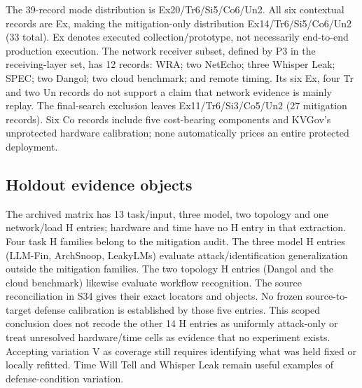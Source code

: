 The 39-record mode distribution is Ex20/Tr6/Si5/Co6/Un2. All six contextual records are Ex, making the mitigation-only distribution Ex14/Tr6/Si5/Co6/Un2 (33 total). Ex denotes executed collection/prototype, not necessarily end-to-end production execution. The network receiver subset, defined by P3 in the receiving-layer set, has 12 records: WRA; two NetEcho; three Whisper Leak; SPEC; two Dangol; two cloud benchmark; and remote timing. Its six Ex, four Tr and two Un records do not support a claim that network evidence is mainly replay. The final-search exclusion leaves Ex11/Tr6/Si3/Co5/Un2 (27 mitigation records). Six Co records include five cost-bearing components and KVGov's unprotected hardware calibration; none automatically prices an entire protected deployment.

\subsection{Holdout evidence objects}
The archived matrix has 13 task/input, three model, two topology and one network/load H entries; hardware and time have no H entry in that extraction. Four task H families belong to the mitigation audit. The three model H entries (LLM-Fin, ArchSnoop, LeakyLMs) evaluate attack/identification generalization outside the mitigation families. The two topology H entries (Dangol and the cloud benchmark) likewise evaluate workflow recognition. The source reconciliation in S34 gives their exact locators and objects. No frozen source-to-target defense calibration is established by those five entries. This scoped conclusion does not recode the other 14 H entries as uniformly attack-only or treat unresolved hardware/time cells as evidence that no experiment exists. Accepting variation V as coverage still requires identifying what was held fixed or locally refitted. Time Will Tell and Whisper Leak remain useful examples of defense-condition variation.
